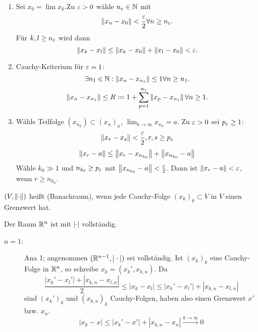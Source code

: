\begin{beweis}
	\begin{enumerate}
		\item Sei $ x_0=\lim x_k $.Zu $ \varepsilon>0 $ w\"ahle $ n_\varepsilon\in\mathbb{N} $ mit \[ \left\|x_n-x_0\right\|<\frac{\varepsilon}{2}\forall n\geq n_\varepsilon. \]
		F\"ur $ k,l\geq n_\varepsilon $ wird dann
		\[ \left\|x_k-x_l\right\|\leq\left\|x_k-x_0\right\|+\left\|x_l-x_0\right\|<\varepsilon. \]
		\item Cauchy-Kriterium f\"ur $ \varepsilon=1 $:
		\[ \exists n_1\in\mathbb{N}:\left\|x_n-x_{n_1}\right\|\leq 1\forall n\geq n_1. \]
		\[ \left\|x_n-x_{n_1}\right\|\leq R\coloneqq 1+\sum_{p=1}^{n_1}\left\|x_p-x_{n_1}\right\|\forall n\geq 1. \]
		\item W\"ahle Teilfolge $ (x_{n_k})\subset (x_n)_n $, $ \lim_{k\to\infty} x_{n_k}=a $. Zu $ \varepsilon>0 $ sei $ p_\varepsilon\geq 1 $:
		\[ \left\|x_r-x_s\right\|<\frac{\varepsilon}{2}, r,s\geq p_\varepsilon\]
		\[ \left\|x_r-a\right\|\leq \left\|x_r-x_{n_{k_0}}\right\|+\left\|x_{n_{k_0}}-a\right\| \]
		W\"ahle $ k_0\gg 1 $ und $ n_{k_0}\geq p_\varepsilon $ mit $ \left\|x_{n_{k_0}}-a\right\|<\frac{\varepsilon}{2} $. Dann ist $ \left\|x_r-a\right\|<\varepsilon $, wenn $ r\geq n_{k_0} $.
	\end{enumerate}
	\vspace{-22pt}
\end{beweis}
\begin{definition}
	$ (V,\left\|\cdot\right\|) $ hei\ss t  (Banachraum), wenn jede Cauchy-Folge $ (x_k)_k\subset V $ in $ V $ einen Grenzwert hat.
\end{definition}
\begin{satz}
	Der Raum $ \mathbb{R}^n $ ist mit $ |\cdot| $ vollst\"andig.
\end{satz}
\begin{beweis}
	\begin{description}
		\item[$ n=1 $:] Ana 1; angenommen $ (\mathbb{R}^{n-1},|\cdot|) $ sei vollst\"andig. Ist $ (x_k)_k $ eine Cauchy-Folge in $ \mathbb{R}^n $, so schreibe $ x_k=(x_k',x_{k,n}) $. Da
		\[ \frac{|x_k'-x_l'|+|x_{k,n}-x_{l,n}|}{2}\leq|x_k-x_l|\leq |x_k'-x_l'|+|x_{k,n}-x_{l,n}| \]
		sind $ (x_k')_k $ und $ (x_{k,n})_k $ Cauchy-Folgen, haben also einen Grenzwert $ x' $ bzw. $ x_n $.
		\[ |x_k-x|\leq|x_k'-x'|+|x_{k,n}-x_n|\xrightarrow{k\to\infty}0 \]
	\end{description}
\end{beweis}
